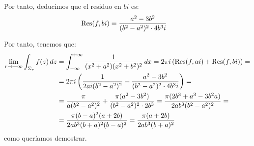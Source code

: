 \begin{ejercicio}
    Por tanto, deducimos que el residuo en $bi$ es:
    \begin{align*}
        \operatorname{Res}(f, bi) &= \dfrac{a^2-3b^2}{(b^2-a^2)^2\cdot 4b^3i}
    \end{align*}

    Por tanto, tenemos que:
    \begin{align*}
        \lim_{r\to+\infty} \int_{\Sigma_r} f(z) \, dz &= \int_{-\infty}^{+\infty} \frac{1}{(x^2 + a^2)(x^2 + b^2)^2} \, dx
        = 2\pi i\left(\operatorname{Res}(f, ai) + \operatorname{Res}(f, bi)\right)
        =\\&= 2\pi i\left(\dfrac{1}{2ai(b^2 - a^2)^2} + \dfrac{a^2-3b^2}{(b^2-a^2)^2\cdot 4b^3i}\right)
        =\\&= \dfrac{\pi}{a(b^2 - a^2)^2} + \dfrac{\pi(a^2-3b^2)}{(b^2-a^2)^2\cdot 2b^3}
        = \dfrac{\pi(2b^3 + a^3-3b^2a)}{2ab^3(b^2-a^2)^2}
        =\\&= \dfrac{\pi(b-a)^2(a+2b)}{2ab^3(b+a)^2(b-a)^2}
        = \dfrac{\pi(a+2b)}{2ab^3(b+a)^2}
    \end{align*}
    como queríamos demostrar.
\end{ejercicio}

